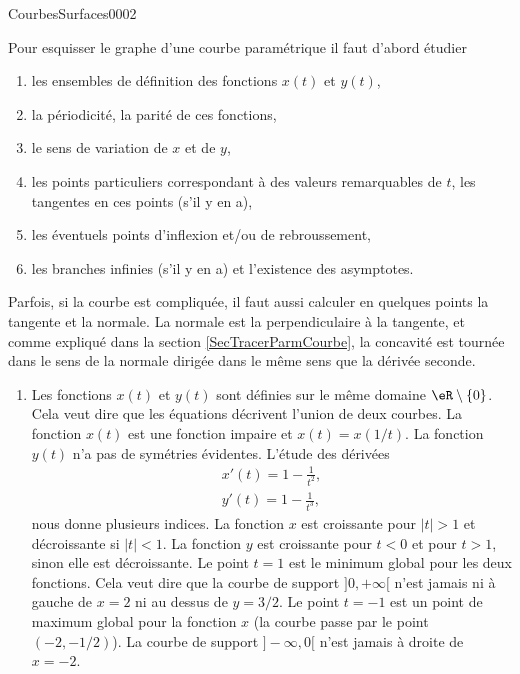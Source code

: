 \begin{corrige}{CourbesSurfaces0002}

Pour esquisser  le graphe d'une courbe paramétrique il faut d'abord étudier 
\let\OldTheenumi\theenumi
\renewcommand{\theenumi}{\roman{enumi}}
\begin{enumerate}
	\item les ensembles de définition des fonctions $x(t)$ et $y(t)$, 

        \item la périodicité, la parité de ces fonctions, 

        \item le sens de variation de $x$ et de $y$, 

        \item les points particuliers correspondant à des valeurs remarquables de $t$, les tangentes en ces points (s'il y en a), 

        \item les éventuels points d'inflexion et/ou de rebroussement, 

        \item les branches infinies (s'il y en a) et l'existence des asymptotes.
		
\end{enumerate}
\let\theenumi\OldTheenumi

Parfois, si la courbe est compliquée,  il faut aussi calculer en quelques points la tangente et la normale. La normale est la perpendiculaire à la tangente, et comme expliqué dans la section \ref{SecTracerParmCourbe}, la concavité est tournée dans le sens de la normale dirigée dans le même sens que la dérivée seconde.

  \begin{enumerate}
      \item \label{Itemzzdexoi}
      Les fonctions $x(t)$ et $y(t)$ sont définies sur le même domaine $\eR\setminus\{0\}$. Cela veut dire que les équations décrivent l'union de deux courbes. La fonction $x(t)$ est une fonction impaire et $x(t)=x(1/t)$. La fonction $y(t)$ n'a pas de symétries évidentes. L'étude des dérivées 
    \begin{equation}
      \begin{aligned}
        x'(t)= 1-\frac{1}{t^2},\\
        y'(t)= 1-\frac{1}{t^3},
      \end{aligned}
    \end{equation}
nous donne plusieurs indices. La fonction $x$ est croissante pour $|t|>1$ et décroissante si $|t|<1$. La fonction $y$ est croissante pour $t<0$ et pour $t>1$, sinon elle est décroissante. Le point $t=1$ est le minimum global pour les deux fonctions. Cela veut dire que la courbe de support $]0, +\infty[$ n'est jamais ni à gauche de  $x=2$ ni au dessus de $y=3/2$. Le point $t=-1$ est un point de maximum global pour la fonction $x$ (la courbe passe par le point $(-2, -1/2)$). La courbe de support $]-\infty, 0[$ n'est jamais à droite de $x=-2$.  


\end{enumerate}
\end{corrige}
